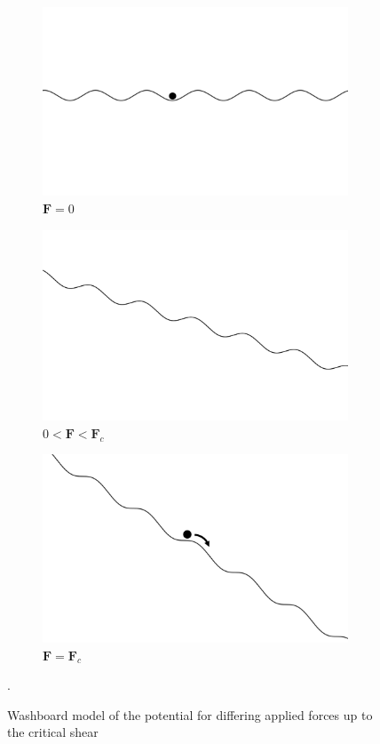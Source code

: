 \documentclass{article}
\numberwithin{equation}{section}
\begin{document}
\begin{figure}[htb]
\centering
\begin{subfigure}[t]{.33\textwidth}
  \centering
  \includegraphics[width=.9\linewidth]{results/Figures/washboard-f0.png}
  \caption{$\mathbf{F}=0$}
  \label{fig:washboard_f0}
\end{subfigure}
\hfill
\begin{subfigure}[t]{.33\textwidth}
  \centering
  \includegraphics[width=.9\linewidth]{results/Figures/washboard-f.png}
  \caption{$0<\mathbf{F}<\mathbf{F}_c$}
  \label{fig:washboard_f}
\end{subfigure}
\hfill
\begin{subfigure}[t]{.33\textwidth}
  \centering
  \includegraphics[width=.9\linewidth]{results/Figures/washboard-fc.png}
  \caption{$\mathbf{F}=\mathbf{F}_c$}
  \label{fig:washboard_fc}
\end{subfigure}
\caption{Washboard model of the potential for differing applied forces up to the critical shear}.
\label{fig:washboard}
\end{figure}
\end{document}
